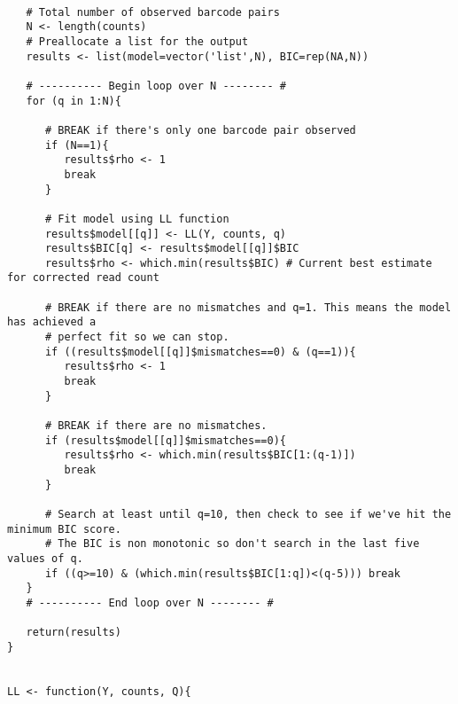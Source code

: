 \begin{footnotesize}
\begin{lstlisting}
   
   # Total number of observed barcode pairs
   N <- length(counts)   
   # Preallocate a list for the output
   results <- list(model=vector('list',N), BIC=rep(NA,N))
   
   # ---------- Begin loop over N -------- #
   for (q in 1:N){
      
      # BREAK if there's only one barcode pair observed  
      if (N==1){
         results$rho <- 1
         break
      }
      
      # Fit model using LL function
      results$model[[q]] <- LL(Y, counts, q)
      results$BIC[q] <- results$model[[q]]$BIC
      results$rho <- which.min(results$BIC) # Current best estimate for corrected read count
      
      # BREAK if there are no mismatches and q=1. This means the model has achieved a 
      # perfect fit so we can stop.
      if ((results$model[[q]]$mismatches==0) & (q==1)){
         results$rho <- 1
         break
      }
      
      # BREAK if there are no mismatches. 
      if (results$model[[q]]$mismatches==0){
         results$rho <- which.min(results$BIC[1:(q-1)])
         break
      }
      
      # Search at least until q=10, then check to see if we've hit the minimum BIC score.
      # The BIC is non monotonic so don't search in the last five values of q.
      if ((q>=10) & (which.min(results$BIC[1:q])<(q-5))) break
   }
   # ---------- End loop over N -------- #
   
   return(results)
}


LL <- function(Y, counts, Q){
   

\end{lstlisting}
\end{footnotesize}
